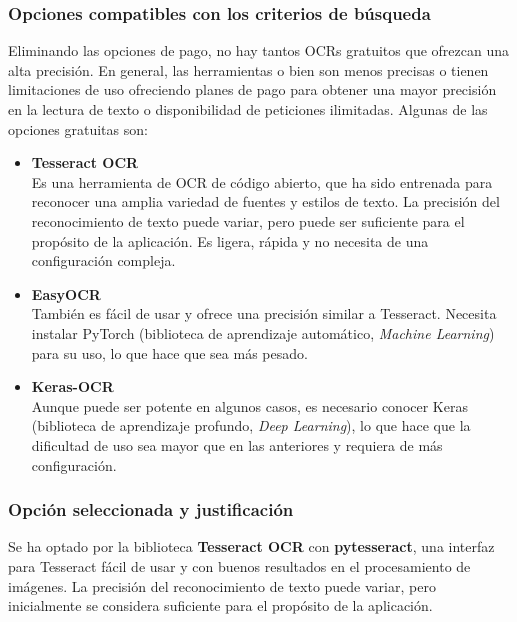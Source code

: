 \subsubsection{Opciones compatibles con los criterios de búsqueda}
Eliminando las opciones de pago, no hay tantos OCRs gratuitos que ofrezcan una alta precisión. En general, las herramientas o bien son menos precisas o tienen limitaciones de uso ofreciendo planes de pago para obtener una mayor precisión en la lectura de texto o disponibilidad de peticiones ilimitadas. Algunas de las opciones gratuitas son:
\begin{itemize}
    \item \textbf{Tesseract OCR}\\
        Es una herramienta de OCR de código abierto, que ha sido entrenada para reconocer una amplia variedad de fuentes y estilos de texto. La precisión del reconocimiento de texto puede variar, pero puede ser suficiente para el propósito de la aplicación. Es ligera, rápida y no necesita de una configuración compleja.
    \item \textbf{EasyOCR}\\
        También es fácil de usar y ofrece una precisión similar a Tesseract. Necesita instalar PyTorch (biblioteca de aprendizaje automático, \textit{Machine Learning}) para su uso, lo que hace que sea más pesado.
    \item \textbf{Keras-OCR}\\
        Aunque puede ser potente en algunos casos, es necesario conocer Keras (biblioteca de aprendizaje profundo, \textit{Deep Learning}), lo que hace que la dificultad de uso sea mayor que en las anteriores y requiera de más configuración. 
\end{itemize}

\subsubsection{Opción seleccionada y justificación}
Se ha optado por la biblioteca \textbf{Tesseract OCR} con \textbf{pytesseract}, una interfaz para Tesseract fácil de usar y con buenos resultados en el procesamiento de imágenes. La precisión del reconocimiento de texto puede variar, pero inicialmente se considera suficiente para el propósito de la aplicación\cite{tesseract2023}.\\



